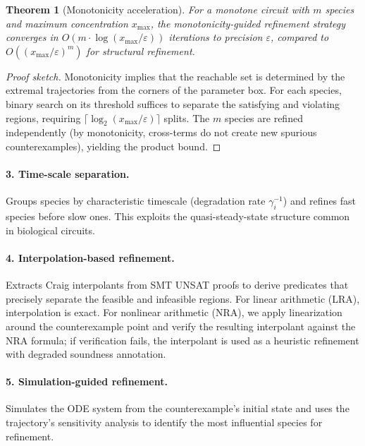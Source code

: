 \documentclass[11pt]{article}
\newtheorem{theorem}{Theorem}
\begin{document}
\begin{theorem}[Monotonicity acceleration]
\label{thm:mono}
For a monotone circuit with $m$ species and maximum concentration
$x_{\max}$, the monotonicity-guided refinement strategy converges in
$O(m \cdot \log(x_{\max}/\varepsilon))$ iterations to precision
$\varepsilon$, compared to $O((x_{\max}/\varepsilon)^m)$ for
structural refinement.
\end{theorem}

\begin{proof}[Proof sketch]
Monotonicity implies that the reachable set is determined by the
extremal trajectories from the corners of the parameter box. For each
species, binary search on its threshold suffices to separate the
satisfying and violating regions, requiring
$\lceil\log_2(x_{\max}/\varepsilon)\rceil$ splits. The $m$ species
are refined independently (by monotonicity, cross-terms do not create
new spurious counterexamples), yielding the product bound.
\end{proof}

\paragraph{3. Time-scale separation.}
Groups species by characteristic timescale (degradation rate
$\gamma_i^{-1}$) and refines fast species before slow ones. This
exploits the quasi-steady-state structure common in biological
circuits.

\paragraph{4. Interpolation-based refinement.}
Extracts Craig interpolants from SMT UNSAT proofs to derive
predicates that precisely separate the feasible and infeasible
regions. For linear arithmetic (LRA), interpolation is exact. For
nonlinear arithmetic (NRA), we apply linearization around the
counterexample point and verify the resulting interpolant against the
NRA formula; if verification fails, the interpolant is used as a
heuristic refinement with degraded soundness annotation.

\paragraph{5. Simulation-guided refinement.}
Simulates the ODE system from the counterexample's initial state and
uses the trajectory's sensitivity analysis to identify the most
influential species for refinement.
\end{document}
